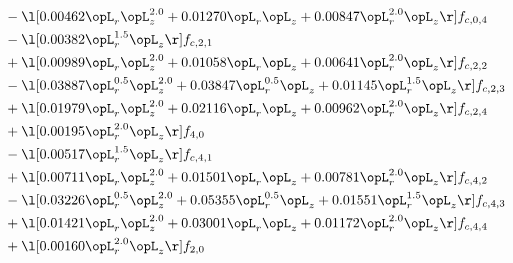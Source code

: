 \begin{alignat}{2}
& - \l[  0.00462 \opL_r \opL_z^{2.0} +  0.01270 \opL_r \opL_z +  0.00847 \opL_r^{2.0} \opL_z  \r] f_{c,0,4} \nonumber \\ 
& - \l[  0.00382 \opL_r^{1.5} \opL_z  \r] f_{c,2,1} \nonumber \\ 
& + \l[  0.00989 \opL_r \opL_z^{2.0} +  0.01058 \opL_r \opL_z +  0.00641 \opL_r^{2.0} \opL_z  \r] f_{c,2,2} \nonumber \\ 
& - \l[  0.03887 \opL_r^{0.5} \opL_z^{2.0} +  0.03847 \opL_r^{0.5} \opL_z +  0.01145 \opL_r^{1.5} \opL_z  \r] f_{c,2,3} \nonumber \\ 
& + \l[  0.01979 \opL_r \opL_z^{2.0} +  0.02116 \opL_r \opL_z +  0.00962 \opL_r^{2.0} \opL_z  \r] f_{c,2,4} \nonumber \\ 
& + \l[  0.00195 \opL_r^{2.0} \opL_z  \r] f_{4,0} \nonumber \\ 
& - \l[  0.00517 \opL_r^{1.5} \opL_z  \r] f_{c,4,1} \nonumber \\ 
& + \l[  0.00711 \opL_r \opL_z^{2.0} +  0.01501 \opL_r \opL_z +  0.00781 \opL_r^{2.0} \opL_z  \r] f_{c,4,2} \nonumber \\ 
& - \l[  0.03226 \opL_r^{0.5} \opL_z^{2.0} +  0.05355 \opL_r^{0.5} \opL_z +  0.01551 \opL_r^{1.5} \opL_z  \r] f_{c,4,3} \nonumber \\ 
& + \l[  0.01421 \opL_r \opL_z^{2.0} +  0.03001 \opL_r \opL_z +  0.01172 \opL_r^{2.0} \opL_z  \r] f_{c,4,4} \nonumber \\ 
& + \l[  0.00160 \opL_r^{2.0} \opL_z  \r] f_{2,0} \nonumber \\ 
\end{alignat} 


